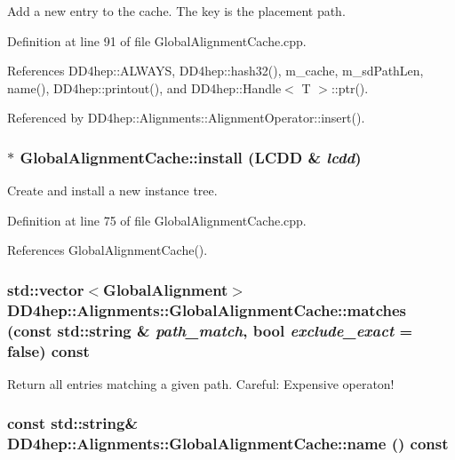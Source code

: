 Add a new entry to the cache. The key is the placement path. 

Definition at line 91 of file GlobalAlignmentCache.cpp.

References DD4hep::ALWAYS, DD4hep::hash32(), m\_\-cache, m\_\-sdPathLen, name(), DD4hep::printout(), and DD4hep::Handle$<$ T $>$::ptr().

Referenced by DD4hep::Alignments::AlignmentOperator::insert().\hypertarget{class_d_d4hep_1_1_alignments_1_1_global_alignment_cache_a3ab52f93597d2c6facf29a0ecea5c7a2}{
\subsubsection[{install}]{ $\ast$ GlobalAlignmentCache::install (LCDD \& {\em lcdd})}}
\label{class_d_d4hep_1_1_alignments_1_1_global_alignment_cache_a3ab52f93597d2c6facf29a0ecea5c7a2}


Create and install a new instance tree. 

Definition at line 75 of file GlobalAlignmentCache.cpp.

References GlobalAlignmentCache().\hypertarget{class_d_d4hep_1_1_alignments_1_1_global_alignment_cache_ace5ffe38851f6f6828f3bcd629406495}{
\subsubsection[{matches}]{\setlength{\rightskip}{0pt plus 5cm}std::vector$<${\bf GlobalAlignment}$>$ DD4hep::Alignments::GlobalAlignmentCache::matches (const std::string \& {\em path\_\-match}, \/  bool {\em exclude\_\-exact} = {\ttfamily false}) const}}
\label{class_d_d4hep_1_1_alignments_1_1_global_alignment_cache_ace5ffe38851f6f6828f3bcd629406495}


Return all entries matching a given path. Careful: Expensive operaton! \hypertarget{class_d_d4hep_1_1_alignments_1_1_global_alignment_cache_a33fb44cff7b649a8bad98ec5589a31f7}{
\subsubsection[{name}]{\setlength{\rightskip}{0pt plus 5cm}const std::string\& DD4hep::Alignments::GlobalAlignmentCache::name () const}}
\label{class_d_d4hep_1_1_alignments_1_1_global_alignment_cache_a33fb44cff7b649a8bad98ec5589a31f7}


